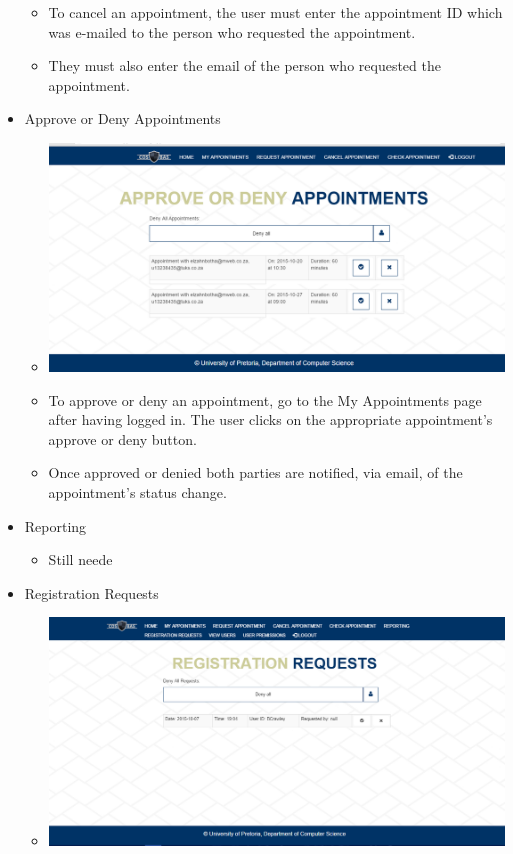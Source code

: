 \begin{itemize}
\begin{itemize}
				\item To cancel an appointment, the user must enter the appointment ID which was e-mailed to the person who requested the appointment.
				\item They must also enter the email of the person who requested the appointment.
			\end{itemize}
		\item Approve or Deny Appointments
			\begin{itemize}
				\item \includegraphics[width=\linewidth]{images/Screenshots/Approve_Deny.png}
				\item To approve or deny an appointment, go to the My Appointments page after having logged in. The user clicks on the appropriate appointment's approve or deny button.
				\item Once approved or denied both parties are notified, via email, of the appointment's status change.
			\end{itemize}
		\item Reporting
			\begin{itemize}
				\item Still neede
			\end{itemize}
		\item Registration Requests
			\begin{itemize}
				\item \includegraphics[width=\linewidth]{images/Screenshots/RegistrationRequests.png}

\end{itemize}
\end{itemize}

